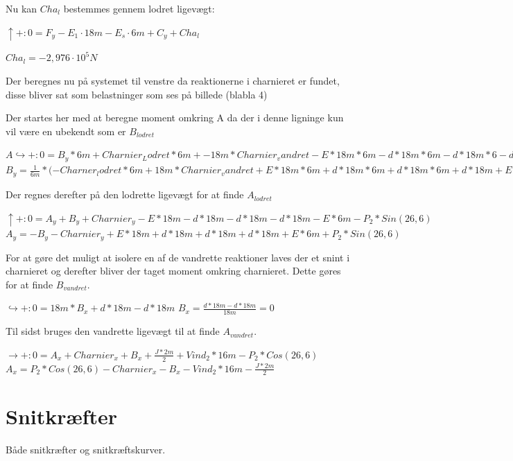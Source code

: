Nu kan $Cha_l$ bestemmes gennem lodret ligevægt: 
\begin{center}
	$\uparrow+: 0 = F_y - E_1 \cdot 18 m - E_s \cdot 6 m + C_y + Cha_l$
\end{center}
\begin{center}	
	$Cha_l = -2,\!976 \cdot 10^5N$
\end{center}

Der beregnes nu på systemet til venstre da reaktionerne i charnieret er fundet, disse bliver sat som belastninger som ses på billede (blabla 4)


Der startes her med at beregne moment omkring A da der i denne ligninge kun vil være en ubekendt som er $B_{lodret}$  
\begin{center}
	$A\hookrightarrow+:0=B_y*6m+Charnier_Lodret*6m+-18m*Charnier_vandret-E*18m*6m-d*18m*6m-d*18m*6-d-18m-E*6m*\frac{6}{2}+P_2*Cos(26,\!6)*18m-Vind_2*18m*(\frac{16}{2}m+2m)-\frac{J*2m}{2}*(\frac{2m}{2})$
	$B_y=\frac{1}{6m}*(-Charner_lodret*6m+18m*Charnier_vandret+E*18m*6m+d*18m*6m+d*18m*6m+d*18m+E*6m*\frac{6}{2}m-P_2*Cos(26,\!6)*18m+Vind_2*18m*(8m+2m+\frac{J*2m}{2}*\frac{2m}{2})$
\end{center}

Der regnes derefter på den lodrette ligevægt for at finde $A_{lodret}$
\begin{center}
	$\uparrow+:0=A_y+B_y+Charnier_y-E*18m-d*18m-d*18m-d*18m-E*6m-P_2*Sin(26,\!6)$
	$A_y=-B_y-Charnier_y+E*18m+d*18m+d*18m+d*18m+E*6m+P_2*Sin(26,\!6)$
\end{center}

For at gøre det muligt at isolere en af de vandrette reaktioner laves der et snint i charnieret og derefter bliver der taget moment omkring charnieret. Dette gøres for at finde $B_{vandret}$.
\begin{center}
	$\hookrightarrow+:0=18m*B_x+d*18m-d*18m$
	$B_x=\frac{d*18m-d*18m}{18m}=0$
\end{center}

Til sidst bruges den vandrette ligevægt til at finde $A_{vandret}$.
\begin{center}
	$\rightarrow+:0=A_x+Charnier_x+B_x+\frac{J*2m}{2}+Vind_2*16m-P_2*Cos(26,\!6)$
	$A_x=P_2*Cos(26,\!6)-Charnier_x-B_x-Vind_2*16m-\frac{J*2m}{2}$
\end{center} 
 
\section{Snitkræfter}
Både snitkræfter og snitkræftskurver.

